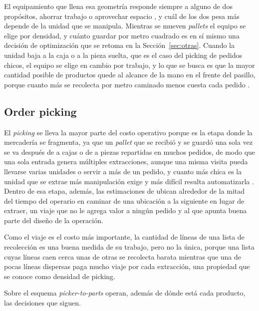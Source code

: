 El equipamiento que llena esa geometría responde siempre a alguno de dos propósitos, ahorrar trabajo o aprovechar espacio \citep[capítulo~5]{bartholdi2014warehouse}, y cuál de los dos pesa más depende de la unidad que se manipula.
Mientras se mueven \emph{pallets} el equipo se elige por densidad, y cuánto guardar por metro cuadrado es en sí mismo una decisión de optimización que se retoma en la Sección~\ref{sec:otras}.
Cuando la unidad baja a la caja o a la pieza suelta, que es el caso del picking de pedidos chicos, el equipo se elige en cambio por trabajo, y lo que se busca es que la mayor cantidad posible de productos quede al alcance de la mano en el frente del pasillo, porque cuanto más se recolecta por metro caminado menos cuesta cada pedido \citep[capítulo~5]{bartholdi2014warehouse}.

\subsection{Order picking}
\label{sec:picking}

El \emph{picking} se lleva la mayor parte del costo operativo porque es la etapa donde la mercadería se fragmenta, ya que un \emph{pallet} que se recibió y se guardó una sola vez se va después de a cajas o de a piezas repartidas en muchos pedidos, de modo que una sola entrada genera múltiples extracciones, aunque una misma visita pueda llevarse varias unidades o servir a más de un pedido, y cuanto más chica es la unidad que se extrae más manipulación exige y más difícil resulta automatizarla \citep{dekoster2007design}.
Dentro de esa etapa, además, las estimaciones de \citet{tompkins2010facilities} ubican alrededor de la mitad del tiempo del operario en caminar de una ubicación a la siguiente en lugar de extraer, un viaje que no le agrega valor a ningún pedido y al que apunta buena parte del diseño de la operación.

Como el viaje es el costo más importante, la cantidad de líneas de una lista de recolección es una buena medida de su trabajo, pero no la única, porque una lista cuyas líneas caen cerca unas de otras se recolecta barata mientras que una de pocas líneas dispersas paga mucho viaje por cada extracción, una propiedad que se conoce como densidad de picking.

Sobre el esquema \emph{picker-to-parts} operan, además de dónde está cada producto, las decisiones que siguen.

